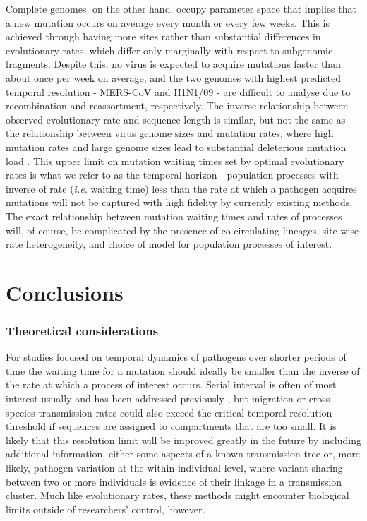 \documentclass[11pt,oneside,letterpaper]{article}
\begin{document}
Complete genomes, on the other hand, occupy parameter space that implies that a new mutation occurs on average every month or every few weeks.
This is achieved through having more sites rather than substantial differences in evolutionary rates, which differ only marginally with respect to subgenomic fragments.
Despite this, no virus is expected to acquire mutations faster than about once per week on average, and the two genomes with highest predicted temporal resolution - MERS-CoV and H1N1/09 - are difficult to analyse due to recombination and reassortment, respectively.
The inverse relationship between observed evolutionary rate and sequence length is similar, but not the same as the relationship between virus genome sizes and mutation rates, where high mutation rates and large genome sizes lead to substantial deleterious mutation load \citep{gago_extremely_2009}.
This upper limit on mutation waiting times set by optimal evolutionary rates is what we refer to as the temporal horizon - population processes with inverse of rate (\textit{i.e.} waiting time) less than the rate at which a pathogen acquires mutations will not be captured with high fidelity by currently existing methods.
The exact relationship between mutation waiting times and rates of processes will, of course, be complicated by the presence of co-circulating lineages, site-wise rate heterogeneity, and choice of model for population processes of interest.

\section*{Conclusions}
\subsubsection*{Theoretical considerations}
For studies focused on temporal dynamics of pathogens over shorter periods of time the waiting time for a mutation should ideally be smaller than the inverse of the rate at which a process of interest occurs.
Serial interval is often of most interest usually and has been addressed previously \citep{campbell_when_2018}, but migration or cross-species transmission rates could also exceed the critical temporal resolution threshold if sequences are assigned to compartments that are too small.
It is likely that this resolution limit will be improved greatly in the future by including additional information, either some aspects of a known transmission tree or, more likely, pathogen variation at the within-individual level, where variant sharing between two or more individuals is evidence of their linkage in a transmission cluster.
Much like evolutionary rates, these methods might encounter biological limits outside of researchers' control, however.
\end{document}
